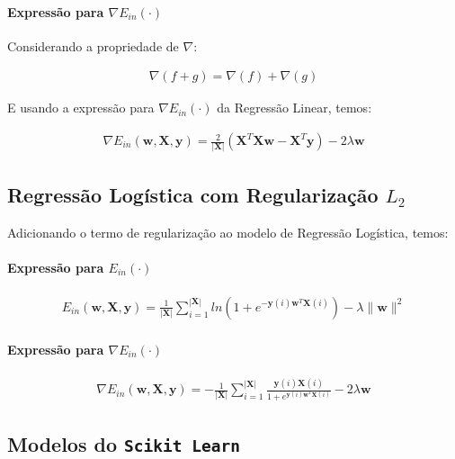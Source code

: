 \documentclass[a4paper, 12pt]{article}
\begin{document}
\paragraph{Expressão para $\nabla{}E_{in}(\cdot)$}

Considerando a propriedade de $\nabla$:

\begin{align*}
    \nabla(f + g) = \nabla(f) + \nabla(g)
\end{align*}

E usando a expressão para $\nabla{}E_{in}(\cdot)$ da Regressão Linear, temos:

\begin{align*}
    \nabla{}E_{in}(\textbf{w}, \textbf{X}, \textbf{y}) = \frac{2}{|\textbf{X}|} (\textbf{X}^{T}\textbf{Xw} - \textbf{X}^{T}\textbf{y}) - 2\lambda\textbf{w}
\end{align*}

\subsection{Regressão Logística com Regularização $L_2$}

Adicionando o termo de regularização ao modelo de Regressão Logística, temos:

\paragraph{Expressão para $E_{in}(\cdot)$}

\begin{align*}
    E_{in}(\textbf{w}, \textbf{X}, \textbf{y}) = \frac{1}{|\textbf{X}|} \sum^{|\textbf{X}|}_{i=1}{ln(1 + e^{-\textbf{y}(i)\textbf{w}^{T}\textbf{X}(i)})} - \lambda\|\textbf{w}\|^{2}
\end{align*}

\paragraph{Expressão para $\nabla{}E_{in}(\cdot)$}

\begin{align*}
    \nabla{}E_{in}(\textbf{w}, \textbf{X}, \textbf{y}) = -\frac{1}{|\textbf{X}|} \sum^{|\textbf{X}|}_{i=1}{\frac{\textbf{y}(i)\textbf{X}(i)}{1 + e^{\textbf{y}(i)\textbf{w}^{T}\textbf{X}(i)}}} - 2\lambda\textbf{w}
\end{align*}

\subsection{Modelos do \texttt{Scikit Learn}}
\end{document}
